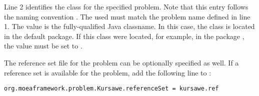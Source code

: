 Line 2 identifies the class for the specified problem.  Note that this entry follows the naming convention .  The  used must match the problem name defined in line 1.  The value is the fully-qualified Java classname.  In this case, the class is located in the default package.  If this class were located, for example, in the package , the value must be set to .

The reference set file for the problem can be optionally specified as well.  If a reference set is available for the problem, add the following line to :

\begin{lstlisting}[language=Plaintext]
org.moeaframework.problem.Kursawe.referenceSet = kursawe.ref
\end{lstlisting}